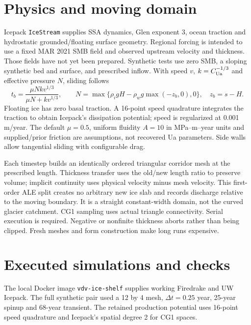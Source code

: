 \documentclass[11pt]{article}
\begin{document}
\section{Physics and moving domain}
Icepack \texttt{IceStream} supplies SSA dynamics, Glen exponent 3, ocean
traction and hydrostatic grounded/floating surface geometry. Regional forcing
is intended to use a fixed MAR 2021 SMB field and observed upstream velocity
and thickness. Those fields have not yet been prepared. Synthetic tests use
zero SMB, a sloping synthetic bed and surface, and prescribed inflow.
With speed $v$, $k=C_{\rm Ua}^{-1/3}$ and effective pressure $N$, sliding follows
\[
 t_b=\frac{\mu N k v^{1/3}}{\mu N+k v^{1/3}},\qquad
 N=\max\{\rho_i gH-\rho_w g\max(-z_b,0),0\},\quad z_b=s-H.
\]
Floating ice has zero basal traction. A 16-point speed quadrature integrates the
traction to obtain Icepack's dissipation potential; speed is regularized at
0.001 m/year. The default $\mu=0.5$, uniform fluidity $A=10$ in MPa--m--year
units and supplied/prior friction are assumptions, not recovered Ua parameters.
Side walls allow tangential sliding with configurable drag.

Each timestep builds an identically ordered triangular corridor mesh at the
prescribed length. Thickness transfer uses the old/new length ratio to preserve
volume; implicit continuity uses physical velocity minus mesh velocity. This
first-order ALE split creates no arbitrary new ice slab and records discharge
relative to the moving boundary. It is a straight constant-width domain, not
the curved glacier catchment. CG1 sampling uses actual triangle connectivity.
Serial execution is required. Negative or nonfinite thickness aborts rather
than being clipped. Fresh meshes and form construction make long runs expensive.

\section{Executed simulations and checks}
The local Docker image \texttt{vdv-ice-shelf} supplies working Firedrake and
UW Icepack. The full synthetic pair used a 12 by 4 mesh, $\Delta t=0.25$ year,
25-year spinup and 68-year transient. The retained production potential uses
16-point speed quadrature and Icepack's spatial degree 2 for CG1 spaces.
\end{document}
